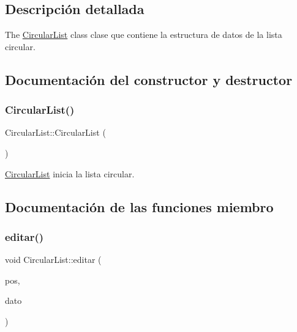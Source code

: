 \subsection{Descripción detallada}
The \mbox{\hyperlink{class_circular_list}{Circular\+List}} class clase que contiene la estructura de datos de la lista circular. 

\subsection{Documentación del constructor y destructor}
\mbox{\label{class_circular_list_ad4877c840f41f3119b1378e7ac35386c}} 
\subsubsection{\texorpdfstring{Circular\+List()}{CircularList()}}
{\footnotesize\ttfamily Circular\+List\+::\+Circular\+List (\begin{DoxyParamCaption}{ }\end{DoxyParamCaption})\hspace{0.3cm}{\ttfamily [inline]}}



\mbox{\hyperlink{class_circular_list}{Circular\+List}} inicia la lista circular. 



\subsection{Documentación de las funciones miembro}
\mbox{\label{class_circular_list_a5f98eb44e45979a6373ad7abda059d44}} 
\subsubsection{\texorpdfstring{editar()}{editar()}}
{\footnotesize\ttfamily void Circular\+List\+::editar (\begin{DoxyParamCaption}\item[{int}]{pos,  }\item[{Q\+String}]{dato }\end{DoxyParamCaption})\hspace{0.3cm}{\ttfamily [inline]}}



